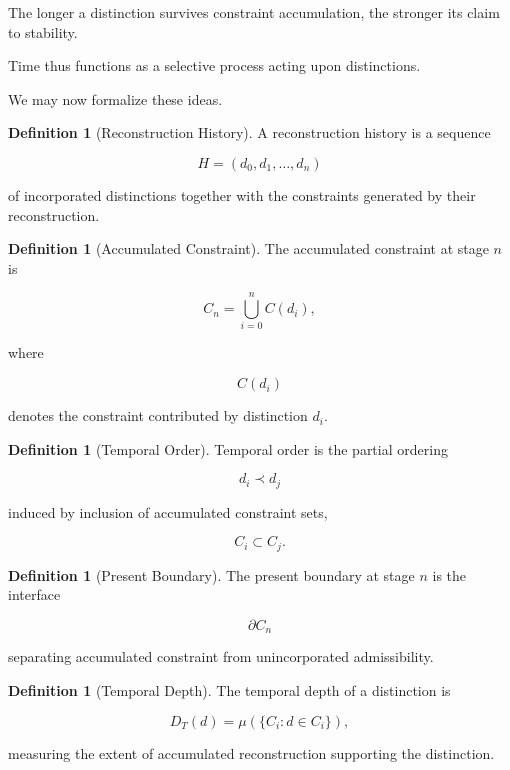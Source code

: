 \documentclass[12pt,oneside]{article}
\theoremstyle{definition}
\newtheorem{definition}[theorem]{Definition} \newtheorem{axiom}[theorem]{Axiom} \newtheorem{remark}[theorem]{Remark} \newtheorem{example}[theorem]{Example}
\begin{document}
The longer a distinction survives constraint accumulation, the stronger its claim to stability.

Time thus functions as a selective process acting upon distinctions.

We may now formalize these ideas.

\begin{definition}[Reconstruction History]

A reconstruction history is a sequence

\[
H
=
(d_0,d_1,\ldots,d_n)
\]

of incorporated distinctions together with the constraints generated by their reconstruction.

\end{definition}

\begin{definition}[Accumulated Constraint]

The accumulated constraint at stage \(n\) is

\[
C_n
=
\bigcup_{i=0}^{n}
C(d_i),
\]

where

\[
C(d_i)
\]

denotes the constraint contributed by distinction \(d_i\).

\end{definition}

\begin{definition}[Temporal Order]

Temporal order is the partial ordering

\[
d_i \prec d_j
\]

induced by inclusion of accumulated constraint sets,

\[
C_i
\subset
C_j.
\]

\end{definition}

\begin{definition}[Present Boundary]

The present boundary at stage \(n\) is the interface

\[
\partial C_n
\]

separating accumulated constraint from unincorporated admissibility.

\end{definition}

\begin{definition}[Temporal Depth]

The temporal depth of a distinction is

\[
D_T(d)
=
\mu\!\left(
\{C_i : d \in C_i\}
\right),
\]

measuring the extent of accumulated reconstruction supporting the distinction.

\end{definition}
\end{document}

